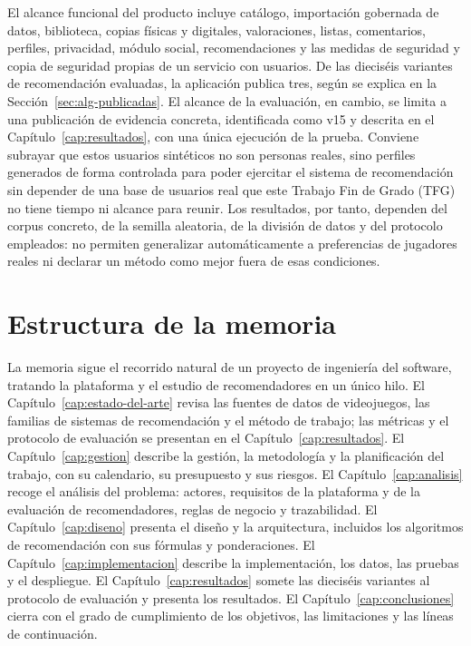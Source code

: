 El alcance funcional del producto incluye catálogo, importación gobernada de datos, biblioteca,
copias físicas y digitales, valoraciones, listas, comentarios, perfiles, privacidad, módulo
social, recomendaciones y las medidas de seguridad y copia de
seguridad propias de un servicio con usuarios. De las dieciséis variantes de recomendación
evaluadas, la aplicación publica tres, según se explica en la
Sección~\ref{sec:alg-publicadas}. El alcance de la evaluación, en cambio, se limita a
una publicación de evidencia concreta, identificada como v15 y descrita en el
Capítulo~\ref{cap:resultados}, con una única ejecución de la prueba. Conviene subrayar que estos usuarios sintéticos no son personas
reales, sino perfiles generados de forma controlada para poder ejercitar el sistema de
recomendación sin depender de una base de usuarios real que este Trabajo Fin de Grado (TFG) no tiene tiempo ni alcance
para reunir. Los resultados, por tanto, dependen del corpus concreto, de la semilla aleatoria,
de la división de datos y del protocolo empleados: no permiten generalizar automáticamente a
preferencias de jugadores reales ni declarar un método como mejor fuera de esas condiciones.

\section{Estructura de la memoria}\label{sec:estructura-memoria}

La memoria sigue el recorrido natural de un proyecto de ingeniería del software, tratando la
plataforma y el estudio de recomendadores en un único hilo. El
Capítulo~\ref{cap:estado-del-arte} revisa las fuentes de datos de videojuegos, las familias de sistemas de
recomendación y el método de trabajo; las métricas y el protocolo de evaluación se presentan en el
Capítulo~\ref{cap:resultados}. El Capítulo~\ref{cap:gestion} describe la
gestión, la metodología y la planificación del trabajo, con su calendario, su presupuesto y sus
riesgos. El Capítulo~\ref{cap:analisis} recoge el análisis del problema: actores, requisitos de
la plataforma y de la evaluación de recomendadores, reglas de negocio y trazabilidad. El
Capítulo~\ref{cap:diseno} presenta el diseño y la arquitectura, incluidos los algoritmos de
recomendación con sus fórmulas y ponderaciones. El Capítulo~\ref{cap:implementacion} describe la
implementación, los datos, las pruebas y el despliegue. El Capítulo~\ref{cap:resultados}
somete las dieciséis variantes al protocolo de evaluación y presenta los resultados. El
Capítulo~\ref{cap:conclusiones} cierra con el grado de cumplimiento de los objetivos, las
limitaciones y las líneas de continuación.
